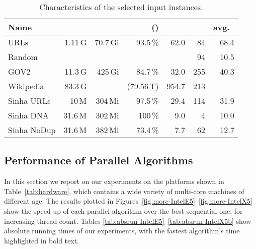 \documentclass[a4paper]{myjournal}
\begin{document}
\begin{table}[tb]\centering\normalsize
\caption{Characteristics of the selected input instances.}\label{tab:data}
\def\tabcolsep{6pt}
\begin{tabular}{l|rrrrrr}
Name        &       &                        &  () &  &  & avg.\              \\ \hline
URLs        & 1.11\,G  & 70.7\,Gi                  & 93.5\,\%            & 62.0          & 84         & 68.4                    \\
Random      &  &                   &                  &            & 94         & 10.5                    \\
GOV2        & 11.3\,G  & 425\,Gi                   & 84.7\,\%            & 32.0          & 255        & 40.3                    \\
Wikipedia   & 83.3\,G  &  & (79.56\,T)          & 954.7         & 213        &  \\
Sinha URLs  & 10\,M    & 304\,Mi                   & 97.5\,\%            & 29.4          & 114        & 31.9                    \\
Sinha DNA   & 31.6\,M  & 302\,Mi                   & 100\,\%             & 9.0           & 4          & 10.0                    \\
Sinha NoDup & 31.6\,M  & 382\,Mi                   & 73.4\,\%            & 7.7           & 62         & 12.7                    \\
\end{tabular}
\end{table}

\subsection{Performance of Parallel Algorithms}\label{sec:exp-parallel}

In this section we report on our experiments on the platforms shown in
Table~\ref{tab:hardware}, which contains a wide variety of multi-core machines
of different age. The results plotted in
Figures~\ref{fig:more-IntelE5}--\ref{fig:more-IntelX5} show the speed up of each
parallel algorithm over the best sequential one, for increasing thread count.
Tables \ref{tab:absrun-IntelE5}--\ref{tab:absrun-IntelX5b} show absolute running
times of our experiments, with the fastest algorithm's time highlighted in bold
text.
\end{document}
